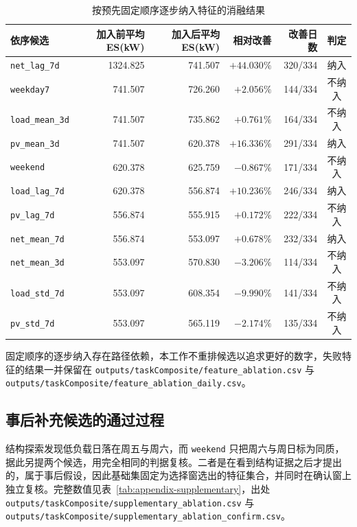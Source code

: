 \begin{appendices}
\begin{table}[htbp]
  \centering
  \small
  \caption{按预先固定顺序逐步纳入特征的消融结果}
  \label{tab:appendix-ablation}
  \begin{tabularx}{\textwidth}{@{}L R R R R c@{}}
    \toprule
    依序候选 & 加入前平均 ES(kW) & 加入后平均 ES(kW) & 相对改善 & 改善日数 & 判定 \\
    \midrule
    \texttt{net\_lag\_7d} & 1324.825 & 741.507 & $+44.030\%$ & 320/334 & 纳入 \\
    \texttt{weekday7} & 741.507 & 726.260 & $+2.056\%$ & 144/334 & 不纳入 \\
    \texttt{load\_mean\_3d} & 741.507 & 735.862 & $+0.761\%$ & 164/334 & 不纳入 \\
    \texttt{pv\_mean\_3d} & 741.507 & 620.378 & $+16.336\%$ & 291/334 & 纳入 \\
    \texttt{weekend} & 620.378 & 625.759 & $-0.867\%$ & 171/334 & 不纳入 \\
    \texttt{load\_lag\_7d} & 620.378 & 556.874 & $+10.236\%$ & 246/334 & 纳入 \\
    \texttt{pv\_lag\_7d} & 556.874 & 555.915 & $+0.172\%$ & 222/334 & 不纳入 \\
    \texttt{net\_mean\_7d} & 556.874 & 553.097 & $+0.678\%$ & 232/334 & 纳入 \\
    \texttt{net\_mean\_3d} & 553.097 & 570.830 & $-3.206\%$ & 114/334 & 不纳入 \\
    \texttt{load\_std\_7d} & 553.097 & 608.354 & $-9.990\%$ & 141/334 & 不纳入 \\
    \texttt{pv\_std\_7d} & 553.097 & 565.119 & $-2.174\%$ & 135/334 & 不纳入 \\
    \bottomrule
  \end{tabularx}
\end{table}

固定顺序的逐步纳入存在路径依赖，本工作不重排候选以追求更好的数字，失败特征的结果一并保留在 \texttt{outputs/\allowbreak taskComposite/\allowbreak feature\_ablation.csv} 与 \texttt{outputs/\allowbreak taskComposite/\allowbreak feature\_ablation\_daily.csv}。

\subsection{事后补充候选的通过过程}

结构探索发现低负载日落在周五与周六，而 \texttt{weekend} 只把周六与周日标为同质，据此另提两个候选，用完全相同的判据复核。二者是在看到结构证据之后才提出的，属于事后假设，因此基础集固定为选择窗选出的特征集合，并同时在确认窗上独立复核。完整数值见表~\ref{tab:appendix-supplementary}，出处 \texttt{outputs/\allowbreak taskComposite/\allowbreak supplementary\_ablation.csv} 与 \texttt{outputs/\allowbreak taskComposite/\allowbreak supplementary\_ablation\_confirm.csv}。


\end{appendices}
